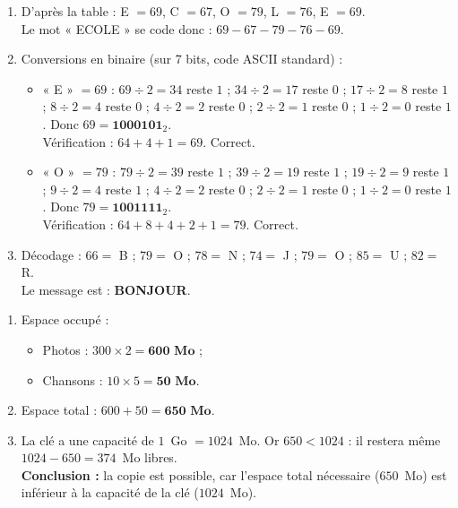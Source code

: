 \documentclass[11pt]{article}
\begin{document}
\begin{corrige}
\begin{enumerate}
\item D'après la table : E $= 69$, C $= 67$, O $= 79$, L $= 76$, E $= 69$.\\
Le mot « ECOLE » se code donc : $69 - 67 - 79 - 76 - 69$.
\item Conversions en binaire (sur 7 bits, code ASCII standard) :
\begin{itemize}
\item « E » $= 69$ : $69 \div 2 = 34$ reste $1$ ; $34 \div 2 = 17$ reste $0$ ; $17 \div 2 = 8$ reste $1$ ; $8 \div 2 = 4$ reste $0$ ; $4 \div 2 = 2$ reste $0$ ; $2 \div 2 = 1$ reste $0$ ; $1 \div 2 = 0$ reste $1$. Donc $69 = \textbf{1000101}_2$.\\
Vérification : $64 + 4 + 1 = 69$. Correct.
\item « O » $= 79$ : $79 \div 2 = 39$ reste $1$ ; $39 \div 2 = 19$ reste $1$ ; $19 \div 2 = 9$ reste $1$ ; $9 \div 2 = 4$ reste $1$ ; $4 \div 2 = 2$ reste $0$ ; $2 \div 2 = 1$ reste $0$ ; $1 \div 2 = 0$ reste $1$. Donc $79 = \textbf{1001111}_2$.\\
Vérification : $64 + 8 + 4 + 2 + 1 = 79$. Correct.
\end{itemize}
\item Décodage : $66 = $ B ; $79 = $ O ; $78 = $ N ; $74 = $ J ; $79 = $ O ; $85 = $ U ; $82 = $ R.\\
Le message est : \textbf{BONJOUR}.
\end{enumerate}
\end{corrige}

\begin{corrige}
\begin{enumerate}
\item Espace occupé :
\begin{itemize}
\item Photos : $300 \times 2 = \textbf{600~Mo}$ ;
\item Chansons : $10 \times 5 = \textbf{50~Mo}$.
\end{itemize}
\item Espace total : $600 + 50 = \textbf{650~Mo}$.
\item La clé a une capacité de $1$~Go $= 1024$~Mo. Or $650 < 1024$ : il restera même $1024 - 650 = 374$~Mo libres.\\
\textbf{Conclusion :} la copie est possible, car l'espace total nécessaire ($650$~Mo) est inférieur à la capacité de la clé ($1024$~Mo).
\end{enumerate}
\end{corrige}
\end{document}
